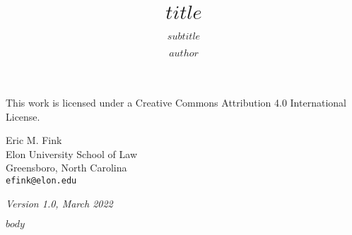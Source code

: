 \documentclass[letterpaper,11pt,twoside,justified,marginals=raggedright]{book}
\title{$title$}
\subtitle{$subtitle$}
\author{$author$}
\date{}
\begin{document}


\frontmatter
\maketitle

\pagestyle{empty}
\begingroup
\parindent 0pt
\vspace*{\fill}
\ccbyncsa

\footnotesize
This work is licensed under a Creative Commons Attribution 4.0 International License.

Eric M. Fink \\
Elon University School of Law \\
Greensboro, North Carolina \\
\texttt{efink@elon.edu}

\itshape{Version 1.0, March 2022}

\endgroup
\clearpage

\setcounter{tocdepth}{1}
\tableofcontents

\mainmatter

$body$
\end{document}
